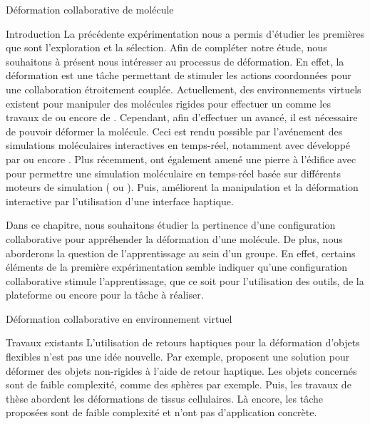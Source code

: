 \documentclass[myfrancais,ngerman,english,frenchb]{mythesis}
\begin{document}
	\begin{mychapter}{Déformation collaborative de molécule}
		\begin{mysection}{Introduction}
			La précédente expérimentation nous a permis d'étudier les premières  que sont l'exploration et la sélection.
			Afin de compléter notre étude, nous souhaitons à présent nous intéresser au processus de déformation.
			En effet, la déformation est une tâche permettant de stimuler les actions coordonnées pour une collaboration étroitement couplée.
			Actuellement, des environnements virtuels existent pour manipuler des molécules rigides pour effectuer un  comme les travaux de  ou encore de .
			Cependant, afin d'effectuer un  avancé, il est nécessaire de pouvoir déformer la molécule.
			Ceci est rendu possible par l'avénement des simulations moléculaires interactives en temps-réel, notamment avec  développé par  ou encore .
			Plus récemment,  ont également amené une pierre à l'édifice avec \myMDDriver pour permettre une simulation moléculaire en temps-réel basée sur différents moteurs de simulation ( ou \myGromacs).
			Puis,  améliorent la manipulation et la déformation interactive par l'utilisation d'une interface haptique.

			Dans ce chapitre, nous souhaitons étudier la pertinence d'une configuration collaborative pour appréhender la déformation d'une molécule.
			De plus, nous aborderons la question de l'apprentissage au sein d'un groupe.
			En effet, certains éléments de la première expérimentation semble indiquer qu'une configuration collaborative stimule l'apprentissage, que ce soit pour l'utilisation des outils, de la plateforme ou encore pour la tâche à réaliser.
		\end{mysection}
		\begin{mysection}{Déformation collaborative en environnement virtuel}
			\begin{mysubsection}{Travaux existants}
				L'utilisation de retours haptiques pour la déformation d'objets flexibles n'est pas une idée nouvelle.
				Par exemple,  proposent une solution pour déformer des objets non-rigides à l'aide de retour haptique.
				Les objets concernés sont de faible complexité, comme des sphères par exemple.
				Puis, les travaux de thèse  abordent les déformations de tissus cellulaires.
				Là encore, les tâche proposées sont de faible complexité et n'ont pas d'application concrète.


\end{mysubsection}
\end{mysection}
\end{mychapter}
\end{document}
